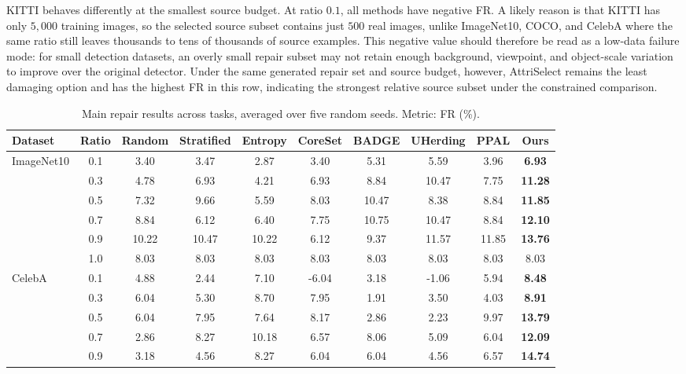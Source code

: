 \documentclass{article}
\newcommand{\model}{AttriSelect\xspace}
\begin{document}
KITTI behaves differently at the smallest source budget. At ratio $0.1$, all methods have negative FR. A likely reason is that KITTI has only $5{,}000$ training images, so the selected source subset contains just $500$ real images, unlike ImageNet10, COCO, and CelebA where the same ratio still leaves thousands to tens of thousands of source examples. This negative value should therefore be read as a low-data failure mode: for small detection datasets, an overly small repair subset may not retain enough background, viewpoint, and object-scale variation to improve over the original detector. Under the same generated repair set and source budget, however, \model remains the least damaging option and has the highest FR in this row, indicating the strongest relative source subset under the constrained comparison.

\begin{table}[t]
\centering
\caption{Main repair results across tasks, averaged over five random seeds. Metric: FR (\%).}
\label{tab:main-fr}
\footnotesize
\setlength{\tabcolsep}{1.5pt}
\begin{tabular}{l c c c c c c c c c}
\toprule
\textbf{Dataset} & Ratio & Random & Stratified & Entropy & CoreSet & BADGE & UHerding & PPAL & \textbf{Ours} \\
\midrule
\multirow{6}{*}{ImageNet10}
& 0.1 & 3.40 & 3.47 & 2.87 & 3.40 & 5.31 & 5.59 & 3.96 & \textbf{6.93} \\
& 0.3 & 4.78 & 6.93 & 4.21 & 6.93 & 8.84 & 10.47 & 7.75 & \textbf{11.28} \\
& 0.5 & 7.32 & 9.66 & 5.59 & 8.03 & 10.47 & 8.38 & 8.84 & \textbf{11.85} \\
& 0.7 & 8.84 & 6.12 & 6.40 & 7.75 & 10.75 & 10.47 & 8.84 & \textbf{12.10} \\
& 0.9 & 10.22 & 10.47 & 10.22 & 6.12 & 9.37 & 11.57 & 11.85 & \textbf{13.76} \\
& 1.0 & 8.03 & 8.03 & 8.03 & 8.03 & 8.03 & 8.03 & 8.03 & 8.03 \\
\midrule
\multirow{6}{*}{CelebA}
& 0.1 & 4.88 & 2.44 & 7.10 & -6.04 & 3.18 & -1.06 & 5.94 & \textbf{8.48} \\
& 0.3 & 6.04 & 5.30 & 8.70 & 7.95 & 1.91 & 3.50 & 4.03 & \textbf{8.91} \\
& 0.5 & 6.04 & 7.95 & 7.64 & 8.17 & 2.86 & 2.23 & 9.97 & \textbf{13.79} \\
& 0.7 & 2.86 & 8.27 & 10.18 & 6.57 & 8.06 & 5.09 & 6.04 & \textbf{12.09} \\
& 0.9 & 3.18 & 4.56 & 8.27 & 6.04 & 6.04 & 4.56 & 6.57 & \textbf{14.74} \\

\end{tabular}
\end{table}
\end{document}
